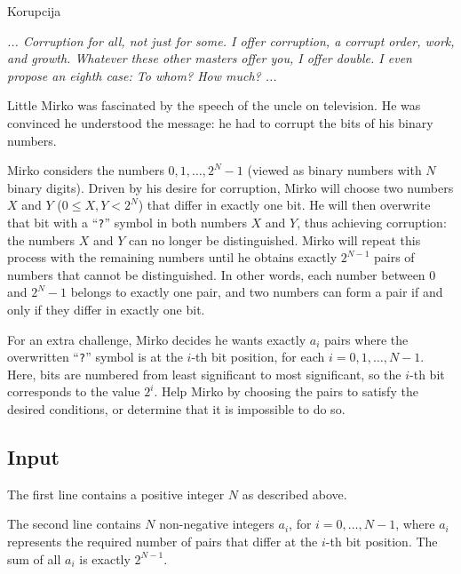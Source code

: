 \begin{statement}[
  problempoints=100,
  timelimit=1 second,
  memorylimit=512 MiB,
]{Korupcija}

\textit{... Corruption for all, not just for some. I offer corruption, a corrupt order, work, and growth. 
Whatever these other masters offer you, I offer double.  
I even propose an eighth case: To whom? How much? ...}

Little Mirko was fascinated by the speech of the uncle on television.  
He was convinced he understood the message: he had to corrupt the bits of his binary numbers.

Mirko considers the numbers $0, 1, \dots, 2^N-1$ (viewed as binary numbers with $N$ binary digits).  
Driven by his desire for corruption, Mirko will choose two numbers $X$ and $Y$ ($0 \leq X, Y < 2^N$) 
that differ in exactly one bit.  
He will then overwrite that bit with a “\texttt{?}” symbol in both numbers $X$ and $Y$, 
thus achieving corruption: the numbers $X$ and $Y$ can no longer be distinguished.  
Mirko will repeat this process with the remaining numbers until he obtains 
exactly $2^{N-1}$ pairs of numbers that cannot be distinguished.  
In other words, each number between $0$ and $2^N-1$ belongs to exactly one pair, and  
two numbers can form a pair if and only if they differ in exactly one bit.

For an extra challenge, Mirko decides he wants exactly $a_i$ pairs 
where the overwritten “\texttt{?}” symbol is at the $i$-th bit position, 
for each $i = 0, 1, \dots, N-1$.  
Here, bits are numbered from least significant to most significant, so the $i$-th bit 
corresponds to the value $2^i$.  
Help Mirko by choosing the pairs to satisfy the desired conditions, or determine 
that it is impossible to do so.

\subsection*{Input}

The first line contains a positive integer $N$ as described above.

The second line contains $N$ non-negative integers $a_i$, for $i = 0, \dots, N-1$,  
where $a_i$ represents the required number of pairs that differ at the $i$-th bit position.  
The sum of all $a_i$ is exactly $2^{N-1}$.


\end{statement}
